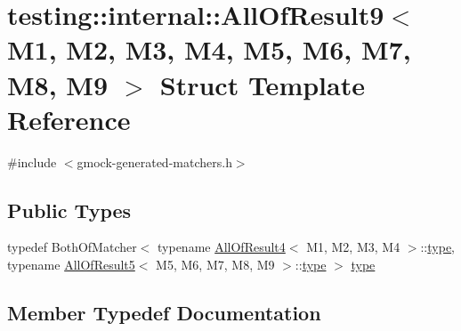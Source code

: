 \hypertarget{structtesting_1_1internal_1_1AllOfResult9}{}\section{testing\+::internal\+::All\+Of\+Result9$<$ M1, M2, M3, M4, M5, M6, M7, M8, M9 $>$ Struct Template Reference}
\label{structtesting_1_1internal_1_1AllOfResult9}


{\ttfamily \#include $<$gmock-\/generated-\/matchers.\+h$>$}

\subsection*{Public Types}
\begin{DoxyCompactItemize}
\item 
typedef Both\+Of\+Matcher$<$ typename \mbox{\hyperlink{structtesting_1_1internal_1_1AllOfResult4}{All\+Of\+Result4}}$<$ M1, M2, M3, M4 $>$\+::\mbox{\hyperlink{structtesting_1_1internal_1_1AllOfResult9_ade56e18d2e0b745968b87fc394710edc}{type}}, typename \mbox{\hyperlink{structtesting_1_1internal_1_1AllOfResult5}{All\+Of\+Result5}}$<$ M5, M6, M7, M8, M9 $>$\+::\mbox{\hyperlink{structtesting_1_1internal_1_1AllOfResult9_ade56e18d2e0b745968b87fc394710edc}{type}} $>$ \mbox{\hyperlink{structtesting_1_1internal_1_1AllOfResult9_ade56e18d2e0b745968b87fc394710edc}{type}}
\end{DoxyCompactItemize}


\subsection{Member Typedef Documentation}
\mbox{\label{structtesting_1_1internal_1_1AllOfResult9_ade56e18d2e0b745968b87fc394710edc}} 
